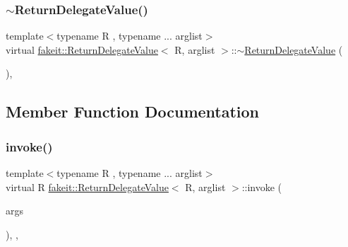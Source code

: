 \subsubsection{\texorpdfstring{$\sim$ReturnDelegateValue()}{~ReturnDelegateValue()}\hspace{0.1cm}{\footnotesize\ttfamily [9/9]}}
{\footnotesize\ttfamily template$<$typename R , typename ... arglist$>$ \\
virtual \mbox{\hyperlink{structfakeit_1_1ReturnDelegateValue}{fakeit\+::\+Return\+Delegate\+Value}}$<$ R, arglist $>$\+::$\sim$\mbox{\hyperlink{structfakeit_1_1ReturnDelegateValue}{Return\+Delegate\+Value}} (\begin{DoxyParamCaption}{ }\end{DoxyParamCaption})\hspace{0.3cm}{\ttfamily [virtual]}, {\ttfamily [default]}}



\subsection{Member Function Documentation}
\mbox{\label{structfakeit_1_1ReturnDelegateValue_a6f3758c13895d1fc748357f94983404a}} 
\subsubsection{\texorpdfstring{invoke()}{invoke()}\hspace{0.1cm}{\footnotesize\ttfamily [1/9]}}
{\footnotesize\ttfamily template$<$typename R , typename ... arglist$>$ \\
virtual R \mbox{\hyperlink{structfakeit_1_1ReturnDelegateValue}{fakeit\+::\+Return\+Delegate\+Value}}$<$ R, arglist $>$\+::invoke (\begin{DoxyParamCaption}\item[{const \mbox{\hyperlink{namespacefakeit_a476a37a598825e1b5dd67b3a176491a1}{Arguments\+Tuple}}$<$ arglist... $>$ \&}]{args }\end{DoxyParamCaption})\hspace{0.3cm}{\ttfamily [inline]}, {\ttfamily [override]}, {\ttfamily [virtual]}}



